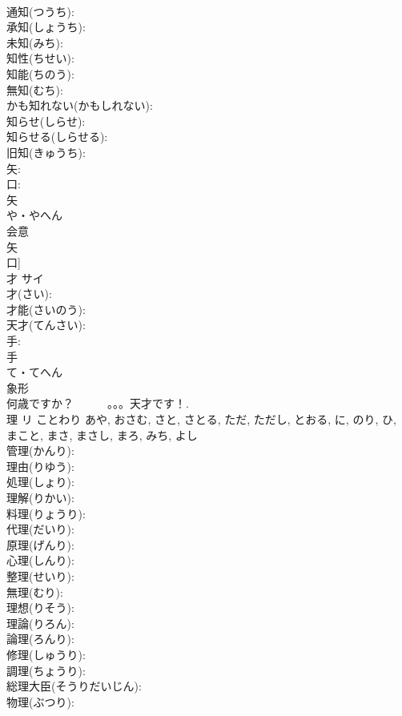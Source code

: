 \documentclass[8pt]{extreport}
\begin{document}
\begin{CJK}{UTF8}{min}
\\	通知(つうち): 
\\	承知(しょうち): 
\\	未知(みち): 
\\	知性(ちせい): 
\\	知能(ちのう): 
\\	無知(むち): 
\\	かも知れない(かもしれない): 
\\	知らせ(しらせ): 
\\	知らせる(しらせる): 
\\	旧知(きゅうち): 
\\	矢: 
\\	口: 
\\	矢	
\\	や・やへん	
\\	会意 
\\	矢 
\\	口] 
\\	才	サイ			
\\	才(さい): 
\\	才能(さいのう): 
\\	天才(てんさい): 
\\	手: 
\\	手	
\\	て・てへん	
\\	象形 
\\	何歳ですか？　　　。。。天才です！.
\\	理	リ	ことわり	あや, おさむ, さと, さとる, ただ, ただし, とおる, に, のり, ひ, まこと, まさ, まさし, まろ, みち, よし	
\\	管理(かんり): 
\\	理由(りゆう): 
\\	処理(しょり): 
\\	理解(りかい): 
\\	料理(りょうり): 
\\	代理(だいり): 
\\	原理(げんり): 
\\	心理(しんり): 
\\	整理(せいり): 
\\	無理(むり): 
\\	理想(りそう): 
\\	理論(りろん): 
\\	論理(ろんり): 
\\	修理(しゅうり): 
\\	調理(ちょうり): 
\\	総理大臣(そうりだいじん): 
\\	物理(ぶつり): 

\end{CJK}
\end{document}

